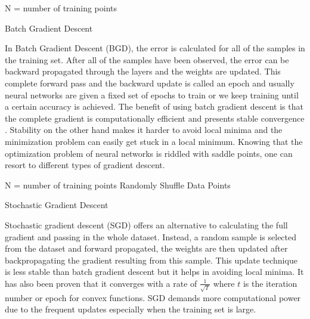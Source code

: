 \begin{minipage}{.7\linewidth}
\begin{algorithm}[H]
N = number of training points\;
 \caption{Batch Gradient Descent}
\end{algorithm}
\end{minipage}

In Batch Gradient Descent (BGD), the error is calculated for all of the samples in the training set. After all of the samples have been observed, the error can be backward propagated through the layers and the weights are updated. This complete forward pass and the backward update is called an epoch and usually neural networks are given a fixed set of epochs to train or we keep training until a certain accuracy is achieved. The benefit of using batch gradient descent is that the complete gradient is computationally efficient and presents stable convergence \cite{ruder2016overview}. Stability on the other hand makes it harder to avoid local minima and the minimization problem can easily get stuck in a local minimum. Knowing that the optimization problem of neural networks is riddled with saddle points, one can resort to different types of gradient descent. 

\begin{minipage}{.7\linewidth}
\begin{algorithm}[H]
N = number of training points\;
Randomly Shuffle Data Points\;
 \caption{Stochastic Gradient Descent}
\end{algorithm}
\end{minipage}

Stochastic gradient descent (SGD) offers an alternative to calculating the full gradient and passing in the whole dataset. Instead, a random sample is selected from the dataset and forward propagated, the weights are then updated after backpropagating the gradient resulting from this sample. This update technique is less stable than batch gradient descent but it helps in avoiding local minima. It has also been proven that it converges with a rate of  $ \frac{1}{\sqrt{T}}  $ where $ \mathit{t} $ is the iteration number or epoch  for convex functions. SGD demands more computational power due to the frequent updates especially when the training set is large.


